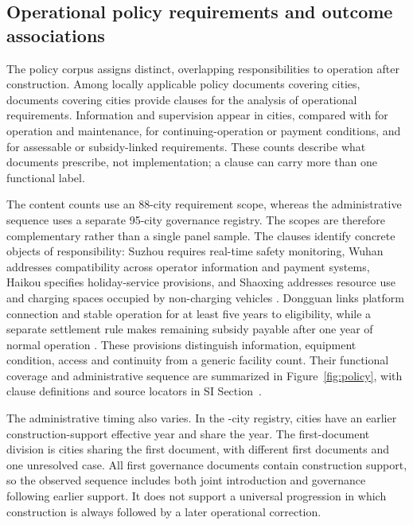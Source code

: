 \subsection{Operational policy requirements and outcome associations}
The policy corpus assigns distinct, overlapping responsibilities to operation after construction. Among \PolicyDocs{} locally applicable policy documents covering \PolicyCities{} cities, \RequirementDocs{} documents covering \RequirementCities{} cities provide \RequirementClauses{} clauses for the analysis of operational requirements. Information and supervision appear in \InformationCities{} cities, compared with \MaintenanceCities{} for operation and maintenance, \ContinuityCities{} for continuing-operation or payment conditions, and \AssessableCities{} for assessable or subsidy-linked requirements. These counts describe what documents prescribe, not implementation; a clause can carry more than one functional label.

The content counts use an 88-city requirement scope, whereas the administrative sequence uses a separate 95-city governance registry. The scopes are therefore complementary rather than a single panel sample. The clauses identify concrete objects of responsibility: Suzhou requires real-time safety monitoring, Wuhan addresses compatibility across operator information and payment systems, Haikou specifies holiday-service provisions, and Shaoxing addresses resource use and charging spaces occupied by non-charging vehicles \citep{gov12,gov5,gov7,gov11}. Dongguan links platform connection and stable operation for at least five years to eligibility, while a separate settlement rule makes remaining subsidy payable after one year of normal operation \citep{gov1}. These provisions distinguish information, equipment condition, access and continuity from a generic facility count. Their functional coverage and administrative sequence are summarized in Figure~\ref{fig:policy}, with clause definitions and source locators in SI Section~.

The administrative timing also varies. In the \GovernanceCities-city registry, \BFirstCount{} cities have an earlier construction-support effective year and \SameYearCount{} share the year. The first-document division is \SameDocumentCities{} cities sharing the first document, \DifferentDocumentCities{} with different first documents and one unresolved case. All first governance documents contain construction support, so the observed sequence includes both joint introduction and governance following earlier support. It does not support a universal progression in which construction is always followed by a later operational correction.

